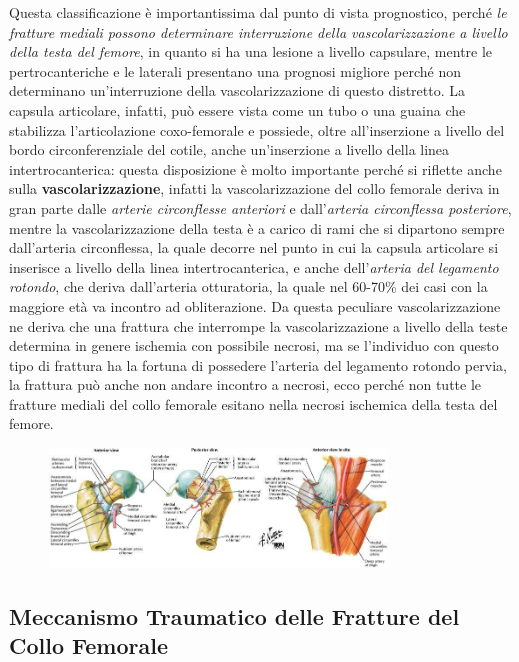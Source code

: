 Questa classificazione è importantissima dal punto di vista prognostico,
perché \emph{le fratture mediali possono determinare interruzione della
vascolarizzazione a livello della testa del femore}, in quanto si ha una
lesione a livello capsulare, mentre le pertrocanteriche e le laterali
presentano una prognosi migliore perché non determinano un'interruzione
della vascolarizzazione di questo distretto. La capsula articolare,
infatti, può essere vista come un tubo o una guaina che stabilizza
l'articolazione coxo-femorale e possiede, oltre all'inserzione a livello
del bordo circonferenziale del cotile, anche un'inserzione a livello
della linea intertrocanterica: questa disposizione è molto importante
perché si riflette anche sulla \textbf{vascolarizzazione}, infatti la
vascolarizzazione del collo femorale deriva in gran parte dalle
\emph{arterie circonflesse anteriori} e dall'\emph{arteria circonflessa
posteriore}, mentre la vascolarizzazione della testa è a carico di rami
che si dipartono sempre dall'arteria circonflessa, la quale decorre nel
punto in cui la capsula articolare si inserisce a livello della linea
intertrocanterica, e anche dell'\emph{arteria del legamento rotondo},
che deriva dall'arteria otturatoria, la quale nel 60-70\% dei casi con
la maggiore età va incontro ad obliterazione. Da questa peculiare
vascolarizzazione ne deriva che una frattura che interrompe la
vascolarizzazione a livello della teste determina in genere ischemia con
possibile necrosi, ma se l'individuo con questo tipo di frattura ha la
fortuna di possedere l'arteria del legamento rotondo pervia, la frattura
può anche non andare incontro a necrosi, ecco perché non tutte le
fratture mediali del collo femorale esitano nella necrosi ischemica
della testa del femore.
\begin{figure}[!ht]
\centering
	\includegraphics[width=0.8\textwidth]{007/image4.jpeg}
\end{figure}

\subsection{Meccanismo Traumatico delle Fratture del Collo Femorale}


